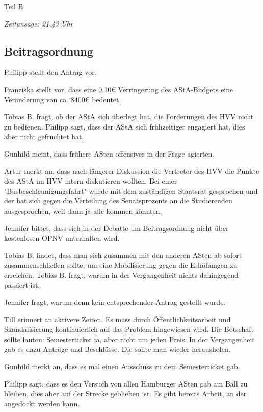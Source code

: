 \documentclass[ngerman,headheight=70pt]{scrartcl}
\begin{document}
    \vspace{0.5cm}
    {\Large \underline{Teil B}}

    \textit{Zeitansage: 21.43 Uhr}

    \subsection{Beitragsordnung}

    Philipp stellt den Antrag vor.

    Franziska stellt vor, dass eine 0,10€ Verringerung des AStA-Budgets eine
    Veränderung von ca. 8400€ bedeutet.

    Tobias B. fragt, ob der AStA sich überlegt hat, die Forderungen des HVV nicht
    zu bedienen. Philipp sagt, dass der AStA sich frühzeitiger engagiert hat,
    dies aber nicht gefruchtet hat.

    Gunhild meint, dass frühere ASten offensiver in der Frage agierten.

    Artur merkt an, dass nach längerer Diskussion die Vertreter des HVV die
    Punkte des AStA im HVV intern diskutieren wollten. Bei einer "Busbeschleunigungsfahrt"
    wurde mit dem zuständigen Staatsrat gesprochen und der hat sich gegen die Verteilung
    des Senatsprozents an die Studierenden ausgesprochen, weil dann ja alle kommen
    könnten.

    Jennifer bittet, dass sich in der Debatte um Beitragsordnung nicht über
    kostenlosen ÖPNV unterhalten wird.

    Tobias B. findet, dass man sich zusammen mit den anderen ASten ab sofort
    zusammenschließen sollte, um eine Mobilisierung gegen die Erhöhungen zu
    erreichen. Tobias B. fragt, warum in der Vergangenheit nichts dahingegend
    passiert ist.

    Jennifer fragt, warum denn kein entsprechender Antrag gestellt wurde.

    Till erinnert an aktivere Zeiten. Es muss durch Öffentlichkeitsarbeit und
    Skandalisierung kontinuierlich auf das Problem hingewiesen wird. Die Botschaft
    sollte lauten: Semesterticket ja, aber nicht um jeden Preis.
    In der Vergangenheit gab es dazu Anträge und Beschlüsse. Die sollte man
    wieder herausholen.

    Gunhild merkt an, dass es mal einen Ausschuss zu dem Semesterticket gab.

    Philipp sagt, dass es den Versuch von allen Hamburger ASten gab am Ball zu
    bleiben, dies aber auf der Strecke geblieben ist. Es gibt bereits Arbeit,
    an der angedockt werden kann.
\end{document}
